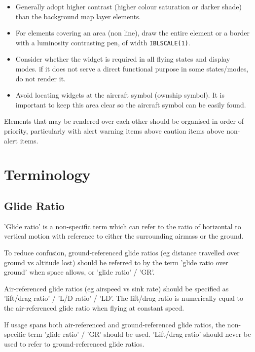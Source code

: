 \documentclass[a4paper,12pt]{refrep}
\begin{document}
\begin{itemize}
\item Generally adopt higher contrast (higher colour saturation or darker shade) 
 than the background map layer elements.

\item For elements covering an area (non line), draw the entire element or a border
with a luminosity contrasting pen, of width \verb|IBLSCALE(1)|.

\item Consider whether the widget is required in all flying states and display modes.
if it does not serve a direct functional purpose in some states/modes, do not
render it.

\item Avoid locating widgets at the aircraft symbol (ownship symbol).
It is important to keep this area clear so the aircraft symbol can be easily found.

\end{itemize}

Elements that may be rendered over each other should be organised in order of
priority, particularly with alert warning items above caution items above non-alert items.

\section{Terminology}
\subsection{Glide Ratio}
'Glide ratio' is a non-specific term which can refer to the ratio of horizontal to 
vertical motion with reference to either the surrounding airmass or the ground.

To reduce confusion, ground-referenced glide ratios (eg distance travelled over 
ground vs altitude lost) should be referred to by the term 'glide ratio over 
ground' when space allows, or 'glide ratio' / 'GR'.

Air-referenced glide ratios (eg airspeed vs sink rate) should be specified as 
'lift/drag ratio' / 'L/D ratio' / 'LD'. The lift/drag ratio is numerically equal 
to the air-referenced glide ratio when flying at constant speed.

If usage spans both air-referenced and ground-referenced glide ratios, the 
non-specific term 'glide ratio' / 'GR' should be used. 'Lift/drag ratio' should 
never be used to refer to ground-referenced glide ratios.
\end{document}
